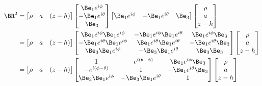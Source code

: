 \begin{align*}
\BR^2 &=
\begin{bmatrix}
\rho &
a & 
(z - h)
\end{bmatrix}
\begin{bmatrix}
\Be_1 e^{i\phi} \\
- \Be_1 e^{i\theta} \\
 \Be_3
\end{bmatrix}
\begin{bmatrix}
\Be_1 e^{i\phi} & - \Be_1 e^{i\theta} & \Be_3
\end{bmatrix}
\begin{bmatrix}
\rho \\
a \\
z - h
\end{bmatrix} \\
&=
\begin{bmatrix}
\rho &
a & 
(z - h)
\end{bmatrix}
\begin{bmatrix}
\Be_1 e^{i\phi} \Be_1 e^{i\phi} & - \Be_1 e^{i\phi} \Be_1 e^{i\theta} & \Be_1 e^{i\phi} \Be_3 \\
- \Be_1 e^{i\theta} \Be_1 e^{i\phi} & \Be_1 e^{i\theta} \Be_1 e^{i\theta} & - \Be_1 e^{i\theta} \Be_3 \\
 \Be_3 \Be_1 e^{i\phi} & -\Be_3 \Be_1 e^{i\theta} & \Be_3 \Be_3 \\
\end{bmatrix}
\begin{bmatrix}
\rho \\
a \\
z - h
\end{bmatrix} \\
&=
\begin{bmatrix}
\rho &
a & 
(z - h)
\end{bmatrix}
\begin{bmatrix}
1 & - e^{i(\theta-\phi)} & \Be_1 e^{i\phi} \Be_3 \\
- e^{i(\phi -\theta)} & 1 & - \Be_1 e^{i\theta} \Be_3 \\
 \Be_3 \Be_1 e^{i\phi} & -\Be_3 \Be_1 e^{i\theta} & 1 \\
\end{bmatrix}
\begin{bmatrix}
\rho \\
a \\
z - h
\end{bmatrix} \\
\end{align*}

